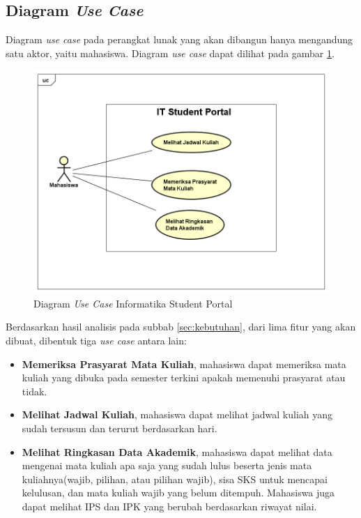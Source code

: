 \subsection{Diagram \textit{Use Case}}
Diagram \textit{use case} pada perangkat lunak yang akan dibangun hanya mengandung satu aktor, yaitu mahasiswa. Diagram \textit{use case} dapat dilihat pada gambar \ref{fig:3_usecase_diagram}. 
		\begin{figure}[H]
			\centering
			\includegraphics[scale=0.5]{Gambar/usecase-diagram}
			\caption{Diagram \textit{Use Case} Informatika Student Portal} 
			\label{fig:3_usecase_diagram}
		\end{figure}
Berdasarkan hasil analisis pada subbab \ref{sec:kebutuhan}, dari lima fitur yang akan dibuat, dibentuk tiga \textit{use case} antara lain:
\begin{itemize}
	\item \textbf{Memeriksa Prasyarat Mata Kuliah}, mahasiswa dapat memeriksa mata kuliah yang dibuka pada semester terkini apakah memenuhi prasyarat atau tidak. 
	\item \textbf{Melihat Jadwal Kuliah}, mahasiswa dapat melihat jadwal kuliah yang sudah tersusun dan terurut berdasarkan hari.
	\item \textbf{Melihat Ringkasan Data Akademik}, mahasiswa dapat melihat data mengenai mata kuliah apa saja yang sudah lulus beserta jenis mata kuliahnya(wajib, pilihan, atau pilihan wajib), sisa SKS untuk mencapai kelulusan, dan mata kuliah wajib yang belum ditempuh. Mahasiswa juga dapat melihat IPS dan IPK yang berubah berdasarkan riwayat nilai.
\end{itemize}

